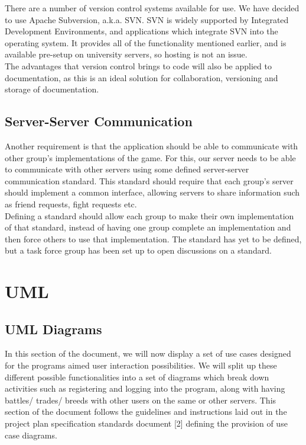 \documentclass[a4paper]{article}
\begin{document}
There are a number of version control systems available for use. We have decided to use Apache Subversion, a.k.a. SVN. SVN is widely supported by Integrated Development Environments, and applications which integrate SVN into the operating system. It provides all of the functionality mentioned earlier, and is available pre-setup on university servers, so hosting is not an issue.\\

The advantages that version control brings to code will also be applied to documentation, as this is an ideal solution for collaboration, versioning and storage of documentation.

\subsection{Server-Server Communication}

Another requirement is that the application should be able to communicate with other group's implementations of the game. For this, our server needs to be able to communicate with other servers using some defined server-server communication standard. This standard should require that each group's server should implement a common interface, allowing servers to share information such as friend requests, fight requests etc.\\

Defining a standard should allow each group to make their own implementation of that standard, instead of having one group complete an implementation and then force others to use that implementation. The standard has yet to be defined, but a task force group has been set up to open discussions on a standard.
\clearpage


\section{UML}
\subsection{UML Diagrams}
In this section of the document, we will now display a set of use cases
designed for the programs aimed user interaction possibilities. We will
split up these different possible functionalities into a set of diagrams
which break down activities such as registering and logging into the
program, along with having battles/ trades/ breeds with other users on the
same or other servers. This section of the document follows the guidelines
and instructions laid out in the project plan specification standards
document [2] defining the provision of use
case diagrams.
\end{document}
